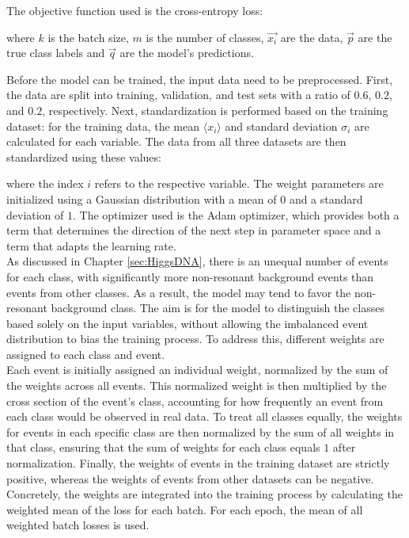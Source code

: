 The objective function used is the cross-entropy loss:


where $k$ is the batch size, $m$ is the number of classes, $\vec{x_i}$ are the data, $\vec{p}$ are the true class labels and $\vec{q}$ are the model's predictions.

Before the model can be trained, the input data need to be preprocessed. First, the data are split into training, validation, and test sets with a ratio of $0.6$, $0.2$, and $0.2$, respectively.
Next, standardization is performed based on the training dataset: for the training data, the mean $\langle x_i \rangle$ and standard deviation $\sigma_i$ are calculated for each variable.
The data from all three datasets are then standardized using these values:


where the index $i$ refers to the respective variable. The weight parameters are initialized using a Gaussian distribution with a mean of $0$ and a standard deviation of $1$.
The optimizer used is the Adam optimizer, which provides both a term that determines the direction of the next step in parameter space and a term that adapts the learning rate. \\

As discussed in Chapter \ref{sec:HiggsDNA}, there is an unequal number of events for each class, with significantly more non-resonant background events than events from other classes. As a result,
the model may tend to favor the non-resonant background class.
The aim is for the model to distinguish the classes based solely on the input variables, without allowing the imbalanced event distribution to bias the training process. To address this, different
weights are assigned to each class and event. \\

Each event is initially assigned an individual weight, normalized by the sum of the weights across all events. This normalized weight is then multiplied by the cross section of the event's class,
accounting for how frequently an event from each class would be observed in real data. To treat all classes equally, the weights for events in each specific class are then normalized by the sum of all weights
in that class, ensuring that the sum of weights for each class equals $1$ after normalization. Finally, the weights of events in the training dataset are strictly positive, whereas the weights of events from
other datasets can be negative. Concretely, the weights are integrated into the training process by calculating the weighted mean of the loss for each batch. For each epoch, the mean of all weighted batch
losses is used. \\

